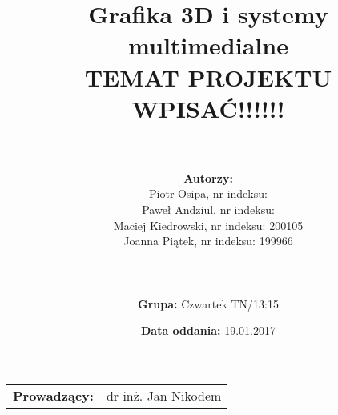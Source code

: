 \documentclass{article}
\title{Grafika 3D i systemy multimedialne\\
	\vspace{5mm}
	\textbf{TEMAT PROJEKTU WPISAĆ!!!!!!}}
\author{\\
	\\\textbf{Autorzy:}
	\\Piotr Osipa, nr indeksu:
	\\Paweł Andziul, nr indeksu: 
	\\Maciej Kiedrowski, nr indeksu: 200105
	\\Joanna Piątek, nr indeksu: 199966
	\\\\
	\\
	\\\textbf{Grupa:} Czwartek TN/13:15}
\date{\textbf{Data oddania:} 19.01.2017}
\begin{document}
\maketitle %

\begin{center}
\begin{tabular}{l r}
\textbf{Prowadzący:} & dr inż. Jan Nikodem %
\end{tabular}
\end{center}
 
\newpage
\tableofcontents 	%
\newpage


\newpage



\end{document}
